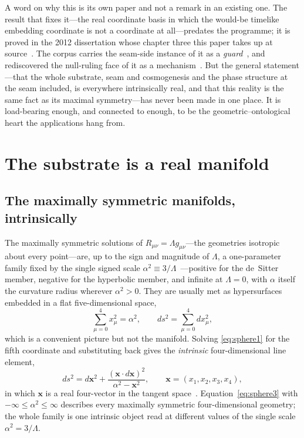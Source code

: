 \documentclass[11pt,a4paper]{article}
\theoremstyle{definition}
\begin{document}
A word on why this is its own paper and not a remark in an existing one.
The result that fixes it---the real coordinate basis in which the
would-be timelike embedding coordinate is not a coordinate at
all---predates the programme; it is proved in the 2012 dissertation whose
chapter three this paper takes up at source~\cite{JanzenThesis}. The
corpus carries the seam-side instance of it as a
\emph{guard}~\cite{JanzenSlicing,JanzenBoundary}, and rediscovered the
null-ruling face of it as a mechanism~\cite{JanzenCRcosmology}. But the
general statement---that the whole substrate, seam and cosmogenesis and
the phase structure at the seam included, is everywhere intrinsically
real, and that this reality is the same fact as its maximal symmetry---has
never been made in one place. It is load-bearing enough, and connected to
enough, to be the geometric--ontological heart the applications hang from.

\section{The substrate is a real manifold}\label{sec:real}

\subsection{The maximally symmetric manifolds, intrinsically}

The maximally symmetric solutions of $R_{\mu\nu}=\Lambda g_{\mu\nu}$---the
geometries isotropic about every point---are, up to the sign and magnitude
of $\Lambda$, a one-parameter family fixed by the single signed scale
$\alpha^{2}\equiv3/\Lambda$~\cite[\S sec\_RPT]{JanzenThesis}---positive for the de~Sitter member, negative
for the hyperbolic member, and infinite at $\Lambda=0$, with $\alpha$ itself the curvature radius wherever
$\alpha^{2}>0$. They are
usually met as hypersurfaces embedded in a flat five-dimensional space,
\begin{equation}
\sum_{\mu=0}^{4}x_\mu^2=\alpha^2,\qquad
ds^2=\sum_{\mu=0}^{4}dx_\mu^2,\label{eq:sphere1}
\end{equation}
which is a convenient picture but not the manifold. Solving
\eqref{eq:sphere1} for the fifth coordinate and substituting back gives the
\emph{intrinsic} four-dimensional line element,
\begin{equation}
ds^2=d\mathbf{x}^2+\frac{(\mathbf{x}\cdot d\mathbf{x})^2}{\alpha^2-\mathbf{x}^2},
\qquad \mathbf{x}=(x_1,x_2,x_3,x_4),\label{eq:sphere3}
\end{equation}
in which $\mathbf{x}$ is a real four-vector in the tangent
space~\cite[Eq.~(sphere3)]{JanzenThesis}. Equation~\eqref{eq:sphere3} with
$-\infty\le\alpha^2\le\infty$ describes every maximally symmetric
four-dimensional geometry; the whole family is one intrinsic object read at
different values of the single scale $\alpha^2=3/\Lambda$.
\end{document}
